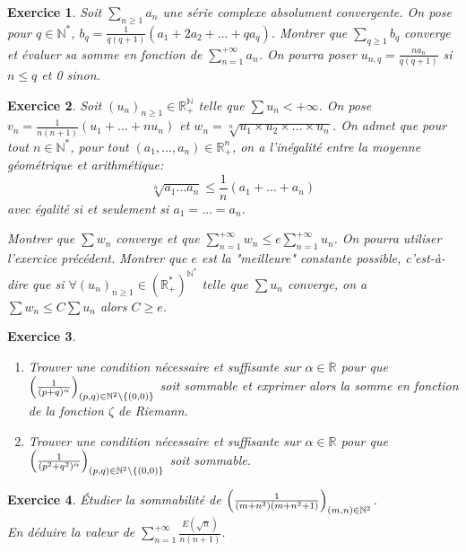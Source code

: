 \documentclass[12pt]{article}
\newtheorem{exercise}{Exercice}[section]
\theoremstyle{remark}
\theoremstyle{remark}
\newcommand{\R}{\mathbb{R}}
\newcommand{\N}{\mathbb{N}}
\begin{document}
\begin{exercise}
	Soit $\sum_{n\geqslant1} a_{n}$ une série complexe absolument convergente.
	On pose pour $q\in\N^{*}$,
	$b_q=\frac{1}{q(q+1)}(a_{1}+2a_{2}+\dots+qa_{q})$. Montrer que
	$\sum_{q\geqslant1}b_{q}$ converge et évaluer sa somme en fonction de
	$\sum_{n=1}^{+\infty}a_{n}$. On pourra poser $u_{n,q}=\frac{na_{n}}{q(q+1)}$
	si $n\leqslant q$ et 0 sinon.
\end{exercise}

\begin{exercise}
	Soit $(u_{n})_{n\geqslant1}\in\R_{+}^{\N}$ telle que $\sum u_{n}<+\infty$.
	On pose $v_{n}=\frac{1}{n(n+1)}(u_{1}+\dots+nu_{n})$ et
	$w_{n}=\sqrt[n]{u_1\times u_2\times\dots\times u_n}$. On admet que pour tout
	$n\in\N^{*}$, pour tout $(a_{1},\dots,a_{n})\in\R_{+}^{n}$, on a l'inégalité
	entre la moyenne géométrique et arithmétique:
	$$\sqrt[n]{a_{1}\dots a_{n}}\leqslant\frac{1}{n}(a_{1}+\dots+a_{n})$$
	avec égalité si et seulement si $a_{1}=\dots=a_{n}$.

	Montrer que $\sum w_{n}$ converge et que $\sum_{n=1}^{+\infty}w_{n}\leqslant
	e\sum_{n=1}^{+\infty}u_{n}$. On pourra utiliser l'exercice précédent.
	Montrer que $e$ est la "meilleure" constante possible, c'est-à-dire que si
	$\forall (u_{n})_{n\geqslant1}\in(\R_{+}^{*})^{\N^{*}}$ telle que $\sum
	u_{n}$ converge, on a $\sum w_{n}\leqslant C\sum u_{n}$ alors $C\geqslant e$.
\end{exercise}

\begin{exercise}
	\phantom{}
	\begin{enumerate}
		\item Trouver une condition nécessaire et suffisante sur $\alpha\in\R$
		pour que
		$\Bigl(\frac{1}{(p+q)^{\alpha}}\Bigr)_{(p,q)\in\N^{2}\setminus\{(0,0)\}}$
		soit sommable et exprimer alors la somme en fonction de la fonction
		$\zeta$ de Riemann.
		\item Trouver une condition nécessaire et suffisante sur $\alpha\in\R$
		pour que
		$\Bigl(\frac{1}{(p^{2}+q^{2})^{\alpha}}\Bigr)_{(p,q)\in\N^{2}\setminus\{(0,0)\}}$
		soit sommable.
	\end{enumerate}
\end{exercise}

\begin{exercise}
	Étudier la sommabilité de
	$\Bigl(\frac{1}{(m+n^{2})(m+n^{2}+1)}\Bigr)_{(m,n)\in\N^{2}}$.\\
	En déduire la
	valeur de $\sum_{n=1}^{+\infty}\frac{E(\sqrt{n})}{n(n+1)}$.
\end{exercise}
\end{document}
